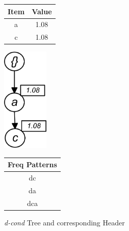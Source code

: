%
\begin{figure}
\begin{minipage}{0.40\textwidth}
  \centering
	\begin{center}
	\begin{tabular}{ |c|c| } 
 	\hline
 		Item&Value\\ \hline\hline
 		a &  1.08  	\\ \hline
 		c &  1.08   	\\ \hline
 		
\end{tabular}
\end{center}  
\end{minipage}
  \hfill
\hfill
\begin{minipage}{0.23\textwidth}
  \centering
  \hfill
  \includegraphics[width=.8\textwidth, height=5cm]{../images/D_COND.jpg}
  \hfill
\end{minipage}
\hfill
\begin{minipage}{0.30\textwidth}
  \centering
  
	\begin{center}
	\begin{tabular}{ |c| } 
 	\hline
 		Freq Patterns \\ \hline\hline
 		dc  	\\ \hline
 		da   	\\ \hline
 		dca   	\\ \hline
 		
\end{tabular}
\end{center}  
\end{minipage}
\caption{\emph{d-cond} Tree and corresponding Header}
\label{figure:d_cond}
\end{figure}
